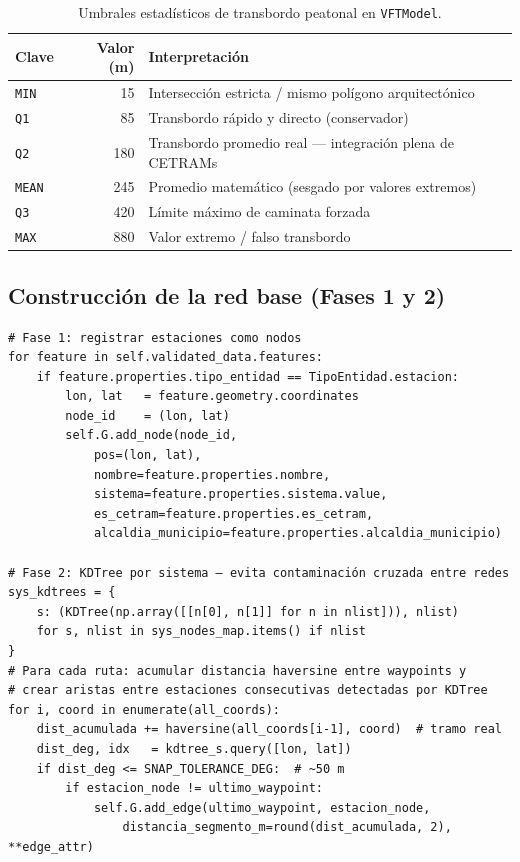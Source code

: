 \begin{table}[H]
    \centering
    \small
    \caption[Umbrales estadísticos de transbordo peatonal]{Umbrales estadísticos
    de transbordo peatonal en \texttt{VFTModel}.
    }
    \label{tab:anx-vft-umbrales}
    \begin{tabular}{|l|r|l|}
        \hline
        \textbf{Clave} & \textbf{Valor (m)} & \textbf{Interpretación} \\
        \hline
        \texttt{MIN}    &   15 & Intersección estricta / mismo polígono arquitectónico \\
        \texttt{Q1}     &   85 & Transbordo rápido y directo (conservador) \\
        \texttt{Q2}     &  180 & Transbordo promedio real — integración plena de CETRAMs \\
        \texttt{MEAN}   &  245 & Promedio matemático (sesgado por valores extremos) \\
        \texttt{Q3}     &  420 & Límite máximo de caminata forzada \\
        \texttt{MAX}    &  880 & Valor extremo / falso transbordo \\
        \hline
    \end{tabular}
\end{table}

\subsection*{Construcción de la red base (Fases 1 y 2)}

\begin{lstlisting}[style=estiloPython,
    caption={Construcción de nodos y aristas de tránsito mediante KDTree por
             sistema. \texttt{src/core/services/graph\_builder.py}.},
    label=lst:vft-graph-base]
# Fase 1: registrar estaciones como nodos
for feature in self.validated_data.features:
    if feature.properties.tipo_entidad == TipoEntidad.estacion:
        lon, lat   = feature.geometry.coordinates
        node_id    = (lon, lat)
        self.G.add_node(node_id,
            pos=(lon, lat),
            nombre=feature.properties.nombre,
            sistema=feature.properties.sistema.value,
            es_cetram=feature.properties.es_cetram,
            alcaldia_municipio=feature.properties.alcaldia_municipio)

# Fase 2: KDTree por sistema — evita contaminación cruzada entre redes
sys_kdtrees = {
    s: (KDTree(np.array([[n[0], n[1]] for n in nlist])), nlist)
    for s, nlist in sys_nodes_map.items() if nlist
}
# Para cada ruta: acumular distancia haversine entre waypoints y
# crear aristas entre estaciones consecutivas detectadas por KDTree
for i, coord in enumerate(all_coords):
    dist_acumulada += haversine(all_coords[i-1], coord)  # tramo real
    dist_deg, idx   = kdtree_s.query([lon, lat])
    if dist_deg <= SNAP_TOLERANCE_DEG:  # ~50 m
        if estacion_node != ultimo_waypoint:
            self.G.add_edge(ultimo_waypoint, estacion_node,
                distancia_segmento_m=round(dist_acumulada, 2), **edge_attr)
\end{lstlisting}

